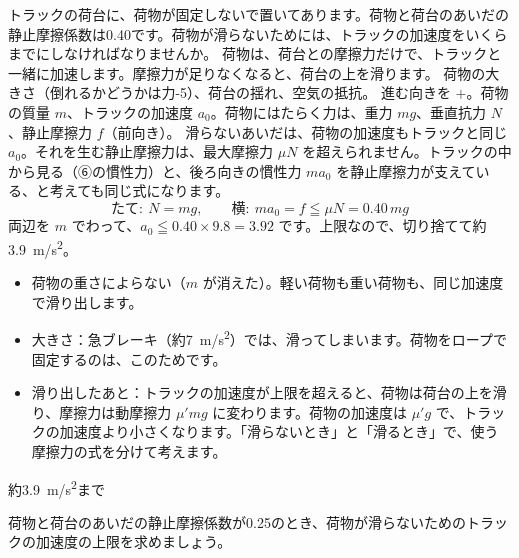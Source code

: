 \begin{phreidai}[トラックの荷台の荷物]
\label{ph:力-2:ex7}トラックの荷台に、荷物が固定しないで置いてあります。荷物と荷台のあいだの静止摩擦係数は0.40です。荷物が滑らないためには、トラックの加速度をいくらまでにしなければなりませんか。
\phbamen
荷物は、荷台との摩擦力だけで、トラックと一緒に加速します。摩擦力が足りなくなると、荷台の上を滑ります。
\phmushi
荷物の大きさ（倒れるかどうかは力-5）、荷台の揺れ、空気の抵抗。
\phzu
進む向きを $+$。荷物の質量 $m$、トラックの加速度 $a_0$。荷物にはたらく力は、重力 $mg$、垂直抗力 $N$、静止摩擦力 $f$（前向き）。
\phriyu
滑らないあいだは、荷物の加速度もトラックと同じ $a_0$。それを生む静止摩擦力は、最大摩擦力 $\mu N$ を超えられません。トラックの中から見る（⑥の慣性力）と、後ろ向きの慣性力 $ma_0$ を静止摩擦力が支えている、と考えても同じ式になります。
\phtateru
\[ \text{たて}:\ N=mg,\qquad \text{横}:\ ma_0=f\leqq\mu N=0.40\,mg \]
\phtoku
両辺を $m$ でわって、$a_0\leqq0.40\times9.8=3.92$ です。上限なので、切り捨てて約\qty{3.9}{m/s^2}。
\phtashikame
\begin{itemize}[leftmargin=1.2\zw, itemsep=1pt, topsep=1pt, label={\color{bkTheme}●}]
\item 荷物の重さによらない（$m$ が消えた）。軽い荷物も重い荷物も、同じ加速度で滑り出します。
\item 大きさ：急ブレーキ（約\qty{7}{m/s^2}）では、滑ってしまいます。荷物をロープで固定するのは、このためです。
\item 滑り出したあと：トラックの加速度が上限を超えると、荷物は荷台の上を滑り、摩擦力は動摩擦力 $\mu'mg$ に変わります。荷物の加速度は $\mu'g$ で、トラックの加速度より小さくなります。「滑らないとき」と「滑るとき」で、使う摩擦力の式を分けて考えます。
\end{itemize}
\kotae 約\qty{3.9}{m/s^2}まで
\end{phreidai}
\begin{jibun}
荷物と荷台のあいだの静止摩擦係数が0.25のとき、荷物が滑らないためのトラックの加速度の上限を求めましょう。
\end{jibun}

